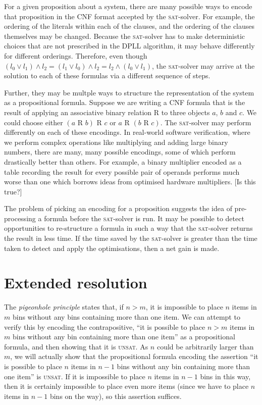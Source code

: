 \documentclass[11pt]{article}
\newcommand{\sat}{\textsc{sat}}
\newcommand{\unsat}{\textsc{unsat}}
\begin{document}
For a given proposition about a system, there are many possible ways to encode that proposition in the CNF format accepted by the \sat{}-solver. For example, the ordering of the literals within each of the clauses, and the ordering of the clauses themselves may be changed. Because the \sat{}-solver has to make deterministic choices that are not prescribed in the DPLL algorithm, it may behave differently for different orderings. Therefore, even though $(l_0 \vee l_1) \wedge l_2 = (l_1 \vee l_0) \wedge l_2 = l_2 \wedge (l_0 \vee l_1)$, the \sat{}-solver may arrive at the solution to each of these formulas via a different sequence of steps.

Further, they may be multple ways to structure the representation of the system as a propositional formula. Suppose we are writing a CNF formula that is the result of applying an associative binary relation R to three objects $a$, $b$ and $c$. We could choose either $(a\mbox{ R }b)\mbox{ R }c$ or $a\mbox{ R }(b\mbox{ R }c)$. The \sat{}-solver may perform differently on each of these encodings. In real-world software verification, where we perform complex operations like multiplying and adding large binary numbers, there are many, many possible encodings, some of which perform drastically better than others. For example, a binary multiplier encoded as a table recording the result for every possible pair of operands performs much worse than one which borrows ideas from optimised hardware multipliers. [Is this true?]

The problem of picking an encoding for a proposition suggests the idea of pre-processing a formula before the \sat{}-solver is run. It may be possible to detect opportunities to re-structure a formula in such a way that the \sat{}-solver returns the result in less time. If the time saved by the \sat{}-solver is greater than the time taken to detect and apply the optimisations, then a net gain is made.

\section{Extended resolution}

The \emph{pigeonhole principle} states that, if $n > m$, it is impossible to place $n$ items in $m$ bins without any bins containing more than one item. We can attempt to verify this by encoding the contrapositive, ``it is possible to place $n>m$ items in $m$ bins without any bin containing more than one item'' as a propositional formula, and then showing that it is \unsat. As $n$ could be arbitrarily larger than $m$, we will actually show that the propositional formula encoding the assertion ``it is possible to place $n$ items in $n-1$ bins without any bin containing more than one item'' is \unsat. If it is impossible to place $n$ items in $n-1$ bins in this way, then it is certainly impossible to place even more items (since we have to place $n$ items in $n-1$ bins on the way), so this assertion suffices.
\end{document}
